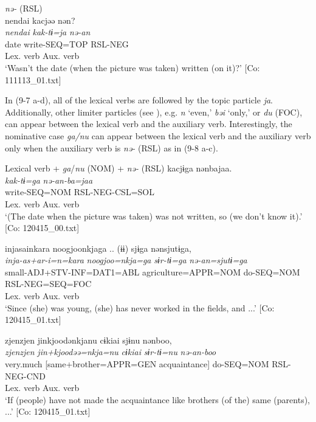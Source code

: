 \ex \textit{nə-} (RSL) \label{ex:9.7d}\\
    \gllll    {\textbar}nendai{\textbar}  kacjəə  nən?\\
      \textit{nendai}  \textit{kak-tɨ=ja}  \textit{nə{}-an}\\
      date  write-SEQ=TOP  RSL-NEG\\
        Lex. verb  Aux. verb\\
      \glt       ‘Wasn’t the date (when the picture was taken) written (on it)?’ [Co: 111113\_01.txt]
    \z
\z

In (9-7 a-d), all of the lexical verbs are followed by the topic particle \textit{ja}. Additionally, other limiter particles (see ), e.g. \textit{n} ‘even,’ \textit{bəi} ‘only,’ or \textit{du} (FOC), can appear between the lexical verb and the auxiliary verb. Interestingly, the nominative case \textit{ga/nu} can appear between the lexical verb and the auxiliary verb only when the auxiliary verb is \textit{nə-} (RSL) as in (9-8 a-c).

\ea   Lexical verb + \textit{ga}/\textit{nu} (NOM) + \textit{nə-} (RSL) \label{ex:9.8}
\ea %
 \gllll  kacjɨga  nənbajaa.\\
      \textit{kak-tɨ=ga}  \textit{nə{}-an-ba=jaa}\\
      write-SEQ=NOM  RSL-NEG-CSL=SOL\\
      Lex. verb  Aux. verb\\
      \glt       ‘(The date when the picture was taken) was not written, so (we don’t know it).’ [Co: 120415\_00.txt]

\ex \label{ex:9.8b} %
    \gllll  injasainkara  noogjoonkjaga ..  (ɨɨ)                   sjɨga  nənsjutɨga,\\
      \textit{inja-as+ar-i=n=kara}  \textit{noogjoo=nkja=ga}            \textit{sɨr-tɨ=ga}  \textit{nə{}-an=sjutɨ=ga}\\
      small-ADJ+STV-INF=DAT1=ABL  agriculture=APPR=NOM                  do-SEQ=NOM  RSL-NEG=SEQ=FOC\\
                                                                        Lex. verb  Aux. verb\\
      \glt       ‘Since (she) was young, (she) has never worked in the fields, and ...’ [Co: 120415\_01.txt]

\ex \label{ex:9.8c} %
     \gllll     zjenzjen  jinkjoodənkjanu  cɨkiai  sjɨnu                                           nənboo,\\
      \textit{zjenzjen}  \textit{jin+kjoodəə=nkja=nu}  \textit{cɨkiai}  \textit{sɨr-tɨ=nu}          \textit{nə{}-an-boo}\\
      very.much  [same+brother=APPR=GEN  acquaintance]  do-SEQ=NOM                                  RSL-NEG-CND\\
        [Complement]    Lex. verb                                                                   Aux. verb\\
      \glt       ‘If (people) have not made the acquaintance like brothers (of the) same (parents), ...’ [Co: 120415\_01.txt]
     \z
\z

